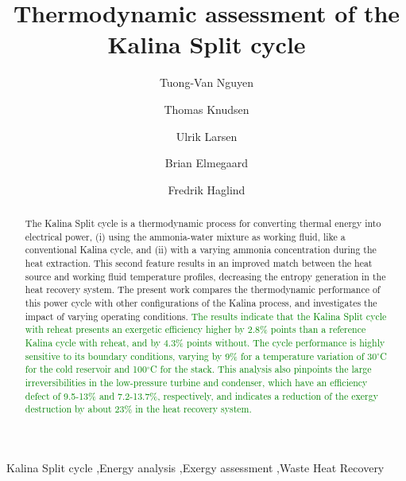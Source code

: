 \documentclass[final,times,3p]{elsarticle}
\begin{document}
\begin{frontmatter}

\title{Thermodynamic assessment of the Kalina Split cycle}

\author[]{Tuong-Van Nguyen}  
\author[]{Thomas Knudsen} 
\author[]{Ulrik Larsen} 
\author[]{Brian Elmegaard} 
\author[]{Fredrik Haglind} 

\address{Section of Thermal Energy, Department of Mechanical Engineering, Technical University of Denmark,\\ Building 403, Nils Koppels All\'{e}, 2800 Kongens Lyngby, Denmark}

\begin{abstract}

The Kalina Split cycle is a thermodynamic process for converting thermal energy into electrical power, (i) using the ammonia-water mixture as working fluid, like a conventional Kalina cycle, and (ii) with a varying ammonia concentration during the heat extraction. This second feature results in an improved match between the heat source and working fluid temperature profiles, decreasing the entropy generation in the heat recovery system.  
The present work compares the thermodynamic performance of this power cycle with other configurations of the Kalina process, and investigates the impact of varying operating conditions. \textcolor{green}{The results indicate that the Kalina Split cycle with reheat presents an exergetic efficiency higher by 2.8\% points than a reference Kalina cycle with reheat, and by 4.3\% points without. The cycle performance is highly sensitive to its boundary conditions, varying by 9\% for a temperature variation of 30$^{\circ}$C for the cold reservoir and 100$^{\circ}$C for the stack. This analysis also pinpoints the large irreversibilities in the low-pressure turbine and condenser, which have an efficiency defect of 9.5-13\% and 7.2-13.7\%, respectively, and indicates a reduction of the exergy destruction by about 23\% in the heat recovery system.} 

\end{abstract}

\begin{keyword}
Kalina Split cycle \sep Energy analysis \sep Exergy assessment \sep Waste Heat Recovery 
\end{keyword}

\end{frontmatter}
\end{document}
